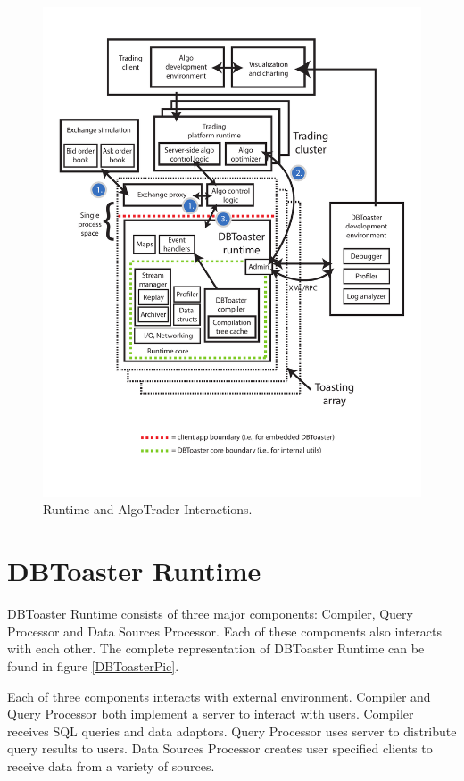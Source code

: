 \documentclass[14pt]{article}
\begin{document}
\begin{figure}
  \includegraphics[width=4.50in]{../figures/finapp.pdf}
  \caption{Runtime and AlgoTrader Interactions.}
  \label{TheBigPicture}
\end{figure}



\section{DBToaster Runtime}

DBToaster Runtime consists of three major components: Compiler, Query Processor and Data Sources Processor. Each of these components also interacts with each other. The complete representation of DBToaster Runtime can be found in figure \ref{DBToasterPic}. 

Each of three components interacts with external environment. Compiler and Query Processor both implement a server to interact with users. Compiler receives SQL queries and data adaptors. Query Processor uses server to distribute query results to users. Data Sources Processor creates user specified clients to receive data from a variety of sources. 
\end{document}
